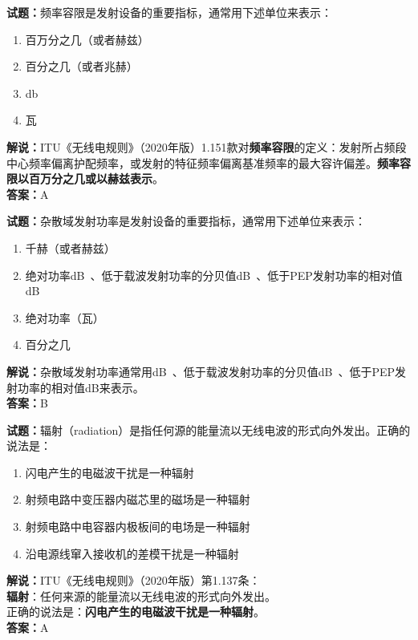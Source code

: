 \documentclass{ctexbook}
\begin{document}
\bigskip


\noindent\textbf{试题：}频率容限是发射设备的重要指标，通常用下述单位来表示：
\begin{enumerate}[leftmargin=3em]
	\item 百万分之几（或者赫兹）
	\item 百分之几（或者兆赫）
	\item \si{\decibel}
	\item 瓦
\end{enumerate}
\noindent\textbf{解说：}ITU《无线电规则》（2020年版）1.151款对\textbf{频率容限}的定义：发射所占频段中心频率偏离护配频率，或发射的特征频率偏离基准频率的最大容许偏差。\textbf{频率容限以百万分之几或以赫兹表示}。\\\noindent\textbf{答案：}A


\bigskip


\noindent\textbf{试题：}杂散域发射功率是发射设备的重要指标，通常用下述单位来表示：
\begin{enumerate}[leftmargin=3em]
	\item 千赫（或者赫兹）
	\item 绝对功率\unit[qualifier-mode=combine]{\deci\bel{}}、低于载波发射功率的分贝值\unit[qualifier-mode=combine]{\deci\bel{}}、低于PEP发射功率的相对值\si{\dB}
	\item 绝对功率（瓦）
	\item 百分之几
\end{enumerate}
\noindent\textbf{解说：}杂散域发射功率通常用\unit[qualifier-mode=combine]{\deci\bel{}}、低于载波发射功率的分贝值\unit[qualifier-mode=combine]{\deci\bel{}}、低于PEP发射功率的相对值\si{\dB}来表示。\\\noindent\textbf{答案：}B

\bigskip


\noindent\textbf{试题：}辐射（radiation）是指任何源的能量流以无线电波的形式向外发出。正确的说法是：
\begin{enumerate}[leftmargin=3em]
\item 闪电产生的电磁波干扰是一种辐射
\item 射频电路中变压器内磁芯里的磁场是一种辐射
\item 射频电路中电容器内极板间的电场是一种辐射
\item 沿电源线窜入接收机的差模干扰是一种辐射
\end{enumerate}
\textbf{解说：}ITU《无线电规则》（2020年版）第1.137条：\\\textbf{辐射}：任何来源的能量流以无线电波的形式向外发出。\\正确的说法是：\textbf{闪电产生的电磁波干扰是一种辐射}。\\\noindent\textbf{答案：}A
\end{document}
